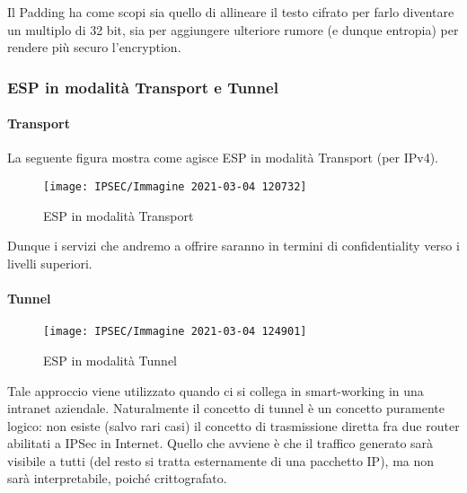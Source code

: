 \documentclass[14pt]{extreport}
\begin{document}
Il Padding ha come scopi sia quello di allineare il testo cifrato per farlo diventare un multiplo di 32 bit, sia per aggiungere ulteriore rumore (e dunque entropia) per rendere più securo l'encryption.



\subsubsection{ESP in modalità Transport e Tunnel}




\paragraph{Transport}

La seguente figura mostra come agisce ESP in modalità Transport (per IPv4).



\begin{figure}[H]
    \centering
    \texttt{[image: IPSEC/Immagine 2021-03-04 120732]}
    \caption{ESP in modalità Transport}
    \label{IPSEC12}
\end{figure}





Dunque i servizi che andremo a offrire saranno in termini di confidentiality verso i livelli superiori. 





\paragraph{Tunnel}



\begin{figure}[H]
    \centering
    \texttt{[image: IPSEC/Immagine 2021-03-04 124901]}
    \caption{ESP in modalità Tunnel}
    \label{IPSEC13}
\end{figure}

Tale approccio viene utilizzato quando ci si collega in smart-working in una intranet aziendale. Naturalmente il concetto di tunnel è un concetto puramente logico: non esiste (salvo rari casi) il concetto di trasmissione diretta fra due router abilitati a IPSec in Internet. Quello che avviene è che il traffico generato sarà visibile a tutti (del resto si tratta esternamente di una pacchetto IP), ma non sarà interpretabile, poiché crittografato.
\end{document}
